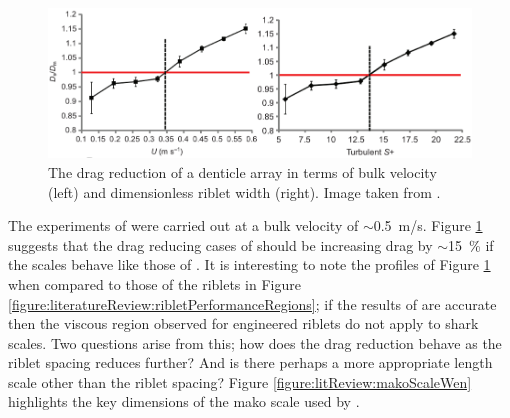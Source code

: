\documentclass[12pt,oneside,a4paper]{article}
\begin{document}
%
\begin{figure}[!b]
\centering
\includegraphics[width=15cm]{images/litReview/sharkScaleDragProfile1.png}
\caption{The drag reduction of a denticle array in terms of bulk velocity (left) and dimensionless riblet width (right). Image taken from \cite{wen2014}.}
\label{figure:literatureReview:dragProfileSharkScales}
\end{figure}
%
The experiments of \cite{fletcher2014phd} were carried out at a bulk velocity of $\sim$\SI{0.5}{m/s}. Figure \ref{figure:literatureReview:dragProfileSharkScales} suggests that the drag reducing cases of \cite{fletcher2014phd} should be increasing drag by $\sim$\SI{15}{\%} if the scales behave like those of \cite{wen2014}. It is interesting to note the profiles of Figure \ref{figure:literatureReview:dragProfileSharkScales} when compared to those of the riblets in Figure \ref{figure:literatureReview:ribletPerformanceRegions}; if the results of \cite{wen2014} are accurate then the viscous region observed for engineered riblets do not apply to shark scales. Two questions arise from this; how does the drag reduction behave as the riblet spacing reduces further? And is there perhaps a more appropriate length scale other than the riblet spacing? Figure \ref{figure:litReview:makoScaleWen} highlights the key dimensions of the mako scale used by \cite{wen2014}.
%
\end{document}
